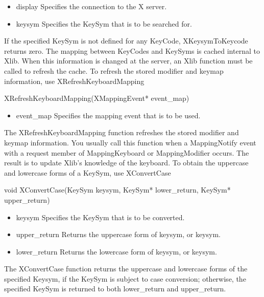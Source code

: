 \documentclass{report}
\begin{document}
\begin{itemize}
\begin{itemize}
\begin{cppcode}
            \end{cppcode}
            \bigbreak \noindent
            \begin{itemize}
                \item display Specifies the connection to the X server.
                \item keysym Specifies the KeySym that is to be searched for.
            \end{itemize}
            If the specified KeySym is not defined for any KeyCode, XKeysymToKeycode returns zero.
            \bigbreak \noindent 
            The mapping between KeyCodes and KeySyms is cached internal to Xlib. When this information is changed at the server, an Xlib function must be called to refresh the cache. To refresh the stored modifier and keymap information, use XRefreshKeyboardMapping
            \bigbreak \noindent 
            \begin{cppcode}
            XRefreshKeyboardMapping(XMappingEvent* event_map)
            \end{cppcode}
            \bigbreak \noindent
            \begin{itemize}
                \item event\_map Specifies the mapping event that is to be used.
            \end{itemize}
            The XRefreshKeyboardMapping function refreshes the stored modifier and keymap information. You usually call this function when a MappingNotify event with a request member of MappingKeyboard or MappingModifier occurs. The result is to update Xlib’s knowledge of the keyboard.
            \bigbreak \noindent 
            To obtain the uppercase and lowercase forms of a KeySym, use XConvertCase
            \bigbreak \noindent 
            \begin{cppcode}
                void XConvertCase(KeySym keysym, KeySym* lower_return, KeySym* upper_return)
            \end{cppcode}
            \bigbreak \noindent
            \begin{itemize}
                \item keysym Specifies the KeySym that is to be converted.
                \item upper\_return Returns the uppercase form of keysym, or keysym.
                \item lower\_return Returns the lowercase form of keysym, or keysym.
            \end{itemize}
            The XConvertCase function returns the uppercase and lowercase forms of the specified Keysym, if the KeySym is subject to case conversion; otherwise, the specified KeySym is returned to both lower\_return and upper\_return.

\end{itemize}
\end{itemize}
\end{document}
